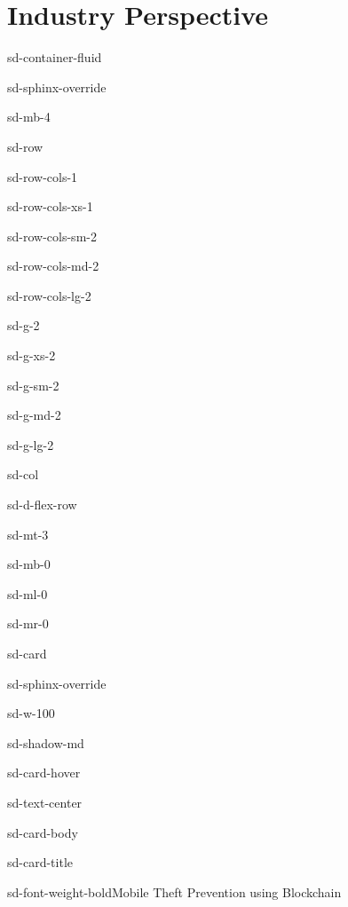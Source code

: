 \documentclass[letterpaper,10pt,english]{jupyterBook}
\begin{document}
\chapter{Industry Perspective}
\label{\detokenize{STRUCTURE/industry:industry-perspective}}\label{\detokenize{STRUCTURE/industry::doc}}
\begin{sphinxuseclass}{sd-container-fluid}
\begin{sphinxuseclass}{sd-sphinx-override}
\begin{sphinxuseclass}{sd-mb-4}
\begin{sphinxuseclass}{sd-row}
\begin{sphinxuseclass}{sd-row-cols-1}
\begin{sphinxuseclass}{sd-row-cols-xs-1}
\begin{sphinxuseclass}{sd-row-cols-sm-2}
\begin{sphinxuseclass}{sd-row-cols-md-2}
\begin{sphinxuseclass}{sd-row-cols-lg-2}
\begin{sphinxuseclass}{sd-g-2}
\begin{sphinxuseclass}{sd-g-xs-2}
\begin{sphinxuseclass}{sd-g-sm-2}
\begin{sphinxuseclass}{sd-g-md-2}
\begin{sphinxuseclass}{sd-g-lg-2}
\begin{sphinxuseclass}{sd-col}
\begin{sphinxuseclass}{sd-d-flex-row}
\begin{sphinxuseclass}{sd-mt-3}
\begin{sphinxuseclass}{sd-mb-0}
\begin{sphinxuseclass}{sd-ml-0}
\begin{sphinxuseclass}{sd-mr-0}
\begin{sphinxuseclass}{sd-card}
\begin{sphinxuseclass}{sd-sphinx-override}
\begin{sphinxuseclass}{sd-w-100}
\begin{sphinxuseclass}{sd-shadow-md}
\begin{sphinxuseclass}{sd-card-hover}
\begin{sphinxuseclass}{sd-text-center}
\begin{sphinxuseclass}{sd-card-body}
\begin{sphinxuseclass}{sd-card-title}
\begin{sphinxuseclass}{sd-font-weight-bold}Mobile Theft Prevention using Blockchain
\end{sphinxuseclass}
\end{sphinxuseclass}





\end{sphinxuseclass}
\end{sphinxuseclass}
\end{sphinxuseclass}
\end{sphinxuseclass}
\end{sphinxuseclass}
\end{sphinxuseclass}
\end{sphinxuseclass}
\end{sphinxuseclass}
\end{sphinxuseclass}
\end{sphinxuseclass}
\end{sphinxuseclass}
\end{sphinxuseclass}
\end{sphinxuseclass}
\end{sphinxuseclass}
\end{sphinxuseclass}
\end{sphinxuseclass}
\end{sphinxuseclass}
\end{sphinxuseclass}
\end{sphinxuseclass}
\end{sphinxuseclass}
\end{sphinxuseclass}
\end{sphinxuseclass}
\end{sphinxuseclass}
\end{sphinxuseclass}
\end{sphinxuseclass}
\end{sphinxuseclass}
\end{sphinxuseclass}
\end{document}
